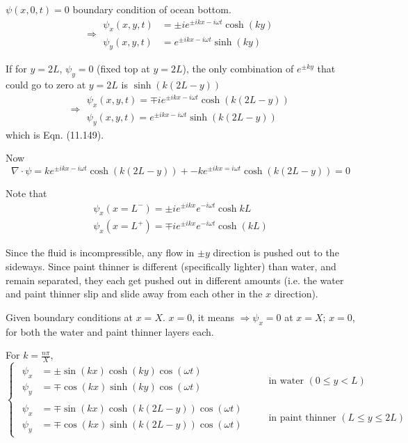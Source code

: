 \documentclass[twoside,10pt]{amsart}
\begin{document}
$\psi(x,0,t) = 0$ boundary condition of ocean bottom.  
\[
\Longrightarrow \begin{aligned} \psi_x(x,y,t) & = \pm i e^{ \pm i kx - i \omega t} \cosh{ (ky)} \\ \psi_y(x,y,t) & = e^{ \pm i kx - i\omega t} \sinh{ (ky)} \end{aligned}
\]

If for $y=2L$, $\psi_y =0$ (fixed top at $y=2L$), the only combination of $e^{\pm ky}$ that could go to zero at $y=2L$ is $\sinh{(k(2L-y))}$ 
\[
\Longrightarrow \begin{aligned}
  \psi_x(x,y,t) = \mp i e^{ \pm i kx - i \omega t} \cosh{( k(2L-y) )} \\ 
  \psi_y(x,y,t) = e^{ \pm i kx - i \omega t } \sinh{ (k(2L-y) ) }
\end{aligned}
\]
which is Eqn. (11.149).  

Now
\[
\nabla \cdot \psi = k e^{ \pm i kx - i \omega t} \cosh{ (k (2L-y))} + -k e^{ \pm i kx = i \omega t} \cosh{ (k(2L-y) )} = 0 
\]

Note that 
\[
\begin{aligned}
  \psi_x(x = L^-) = \pm i e^{ \pm i kx }e^{ -i \omega t} \cosh{ kL} \\ 
  \psi_x(x= L^+) = \mp i e^{ \pm i kx} e^{ -i \omega t} \cosh{(kL)}
\end{aligned}
\]

Since the fluid is incompressible, any flow in $\pm y$ direction is pushed out to the sideways.  Since paint thinner is different (specifically lighter) than water, and remain separated, they each get pushed out in different amounts (i.e. the water and paint thinner slip and slide away from each other in the $x$ direction).  

Given boundary conditions at $x=X$.  $x=0$, it means $\Longrightarrow \psi_x = 0$ at $x=X$; $x=0$, for both the water and paint thinner layers each.  

For $k= \frac{n\pi}{X}$, 
\[
\begin{cases}
  \begin{aligned} \psi_x & = \pm \sin{(kx)} \cosh{ (ky)}\cos{(\omega t)} \\ \psi_y & = \mp \cos{(kx)} \sinh{(ky)} \cos{(\omega t )} \end{aligned} \quad \, & \text{ in water } (0\leq y <L) \\
  \begin{aligned} \psi_x & = \mp \sin{(kx)} \cosh{ (k(2L-y))}\cos{(\omega t)} \\ \psi_y & = \mp \cos{(kx)} \sinh{(k(2L-y))} \cos{(\omega t )} \end{aligned} \quad \, & \text{ in paint thinner } (L\leq y \leq 2L)
\end{cases}
\]
\end{document}
